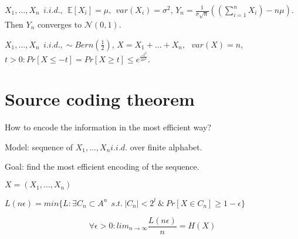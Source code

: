 \begin{thm}
	$X_1, \dots, X_n \ \ i.i.d., \ \ \mathbb{E}[X_i] = \mu, \ \ var(X_i) = \sigma^2$, $Y_n = \frac{1}{\sigma \sqrt{n}} ((\sum_{i=1}^n X_i) - n \mu)$. Then $Y_n$ converges to $\mathcal{N}(0, 1)$.
\end{thm}

\begin{thm}
	$X_1, \dots, X_n \ \ i.i.d., \sim Bern(\frac{1}{2})$, $X = X_1 + \dots + X_n, \ \ \ var(X) = n$, $t > 0: Pr[X \leq -t] = Pr[X \geq t] \leq e^{\frac{-t^2}{2\sigma^2}}$.
\end{thm}

\section{Source coding theorem}

How to encode the information in the most efficient way?

Model: sequence of $X_1, \dots, X_n i.i.d.$ over finite alphabet.

Goal: find the most efficient encoding of the sequence.

$X = (X_1, \dots, X_n)$

$L(n \epsilon) = min \{ L : \exists C_n \subset A^n \ \  s.t. \ |C_n| < 2^l \ \& \ Pr[X \in C_n] \geq 1 -\epsilon \}$

\begin{thm}
	$$
	\forall \epsilon > 0: lim_{n \rightarrow \infty} \frac{L(n \epsilon)}{n} = H(X)
	$$
\end{thm}